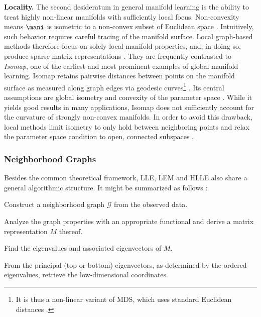 \textbf{Locality.} The second desideratum in general manifold learning is the 
ability to treat highly non-linear manifolds with sufficiently local focus.
Non-convexity means $\mani$ is isometric to a non-convex subset of Euclidean 
space \citep{donohogrimes2003}. 
Intuitively, such behavior requires careful tracing of the manifold surface.
Local graph-based methods therefore focus on solely local manifold properties, 
and, in doing so, produce sparse matrix representations \citep{cayton2005}.
They are frequently contrasted to \textit{Isomap}, one of the 
earliest and most prominent examples of global manifold learning.
Isomap retains pairwise distances between points on the manifold surface as 
measured along graph edges via geodesic curves\footnote{
It is thus a non-linear variant of MDS, which uses standard Euclidean distances 
\citep{tenenbaumdesilvalangford2000}.
} \citep{tenenbaumdesilvalangford2000}.
Its central assumptions are global isometry and convexity of the parameter 
space \citep{tenenbaumdesilvalangford2000}.
While it yields good results in many applications, Isomap does not sufficiently 
account for the curvature of strongly non-convex manifolds.
In order to avoid this drawback, local methods limit isometry to only hold 
between neighboring points and relax the parameter space 
condition to open, connected subspaces \citep{donohogrimes2003}.


\subsubsection{Neighborhood Graphs}
\label{algo-common}

Besides the common theoretical framework, LLE, LEM and HLLE also share a general 
algorithmic structure.
It might be summarized as follows \citep{bengioetal2003}:

\begin{tight_enumerate}
  \item Construct a neighborhood graph $\mathcal{G}$ from the observed data.
  \item Analyze the graph properties with an appropriate functional and derive 
  a matrix representation $M$ thereof.
  \item Find the eigenvalues and associated eigenvectors of $M$.
  \item From the principal (top or bottom) eigenvectors, as determined by the 
  ordered eigenvalues, retrieve the low-dimensional coordinates.
\end{tight_enumerate}

